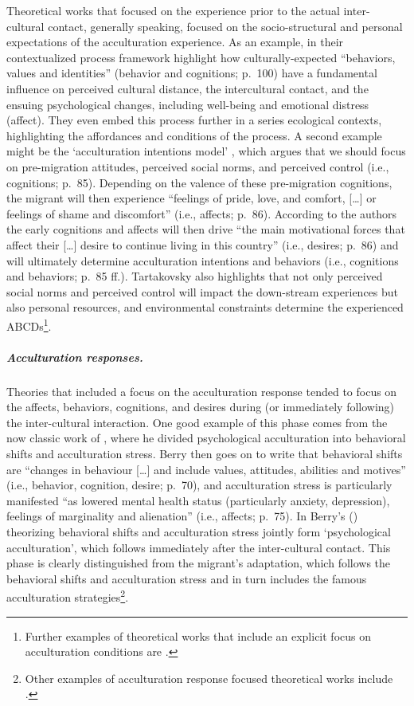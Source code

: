 Theoretical works that focused on the experience prior to the actual
inter-cultural contact, generally speaking, focused on the
socio-structural and personal expectations of the acculturation
experience. As an example, \citet[][]{Ward2016} in their contextualized
process framework highlight how culturally-expected ``behaviors, values
and identities'' (behavior and cognitions; p.~100) have a fundamental
influence on perceived cultural distance, the intercultural contact, and
the ensuing psychological changes, including well-being and emotional
distress (affect). They even embed this process further in a series
ecological contexts, highlighting the affordances and conditions of the
process. A second example might be the `acculturation intentions model'
\citep[][]{Tartakovsky2012}, which argues that we should focus on
pre-migration attitudes, perceived social norms, and perceived control
(i.e., cognitions; p.~85). Depending on the valence of these
pre-migration cognitions, the migrant will then experience ``feelings of
pride, love, and comfort, {[}\ldots{]} or feelings of shame and
discomfort'' (i.e., affects; p.~86). According to the authors the early
cognitions and affects will then drive ``the main motivational forces
that affect their {[}\ldots{]} desire to continue living in this
country'' (i.e., desires; p.~86) and will ultimately determine
acculturation intentions and behaviors (i.e., cognitions and behaviors;
p.~85 ff.). Tartakovsky also highlights that not only perceived social
norms and perceived control will impact the down-stream experiences but
also personal resources, and environmental constraints determine the
experienced
ABCDs\footnote{Further examples of theoretical works that include an explicit focus on acculturation conditions are \citet[][]{Kim1988, Rogler1994, Navas2005, Giles1977, Robinson2019, Serdarevic2005}.}.

\subparagraph{Acculturation responses.}

Theories that included a focus on the acculturation response tended to
focus on the affects, behaviors, cognitions, and desires during (or
immediately following) the inter-cultural interaction. One good example
of this phase comes from the now classic work of \citet[][]{Berry1992},
where he divided psychological acculturation into behavioral shifts and
acculturation stress. Berry then goes on to write that behavioral shifts
are ``changes in behaviour {[}\ldots{]} and include values, attitudes,
abilities and motives'' (i.e., behavior, cognition, desire; p.~70), and
acculturation stress is particularly manifested ``as lowered mental
health status (particularly anxiety, depression), feelings of
marginality and alienation'' (i.e., affects; p.~75). In Berry's
(\citeyear{Berry1992}) theorizing behavioral shifts and acculturation
stress jointly form `psychological acculturation', which follows
immediately after the inter-cultural contact. This phase is clearly
distinguished from the migrant's adaptation, which follows the
behavioral shifts and acculturation stress and in turn includes the
famous acculturation
strategies\footnote{Other examples of acculturation response focused theoretical works include \citet[][]{Berry2005, Sam2003, Riedel2011, Ward2016}.}.

